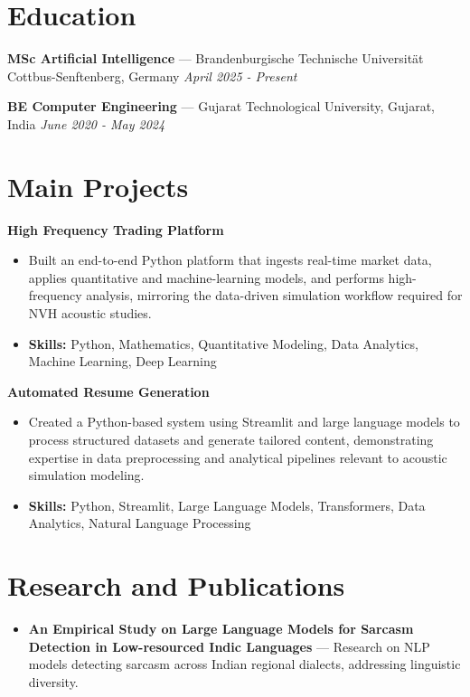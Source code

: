 \documentclass[a4paper,10pt]{article}
\begin{document}
\section*{Education}
\textbf{MSc Artificial Intelligence} — Brandenburgische Technische Universität Cottbus-Senftenberg, Germany \hfill \textit{April 2025 - Present}\par
\vspace{1.5pt}
\textbf{BE Computer Engineering} — Gujarat Technological University, Gujarat, India \hfill \textit{June 2020 - May 2024}\par

\section*{Main Projects}
\textbf{High Frequency Trading Platform}\par
\vspace{1pt}
\begin{itemize}
  \item Built an end-to-end Python platform that ingests real-time market data, applies quantitative and machine-learning models, and performs high-frequency analysis, mirroring the data-driven simulation workflow required for NVH acoustic studies.
  \item \textbf{Skills:} Python, Mathematics, Quantitative Modeling, Data Analytics, Machine Learning, Deep Learning
\end{itemize}
\vspace{3pt}
\textbf{Automated Resume Generation}\par
\vspace{1pt}
\begin{itemize}
  \item Created a Python-based system using Streamlit and large language models to process structured datasets and generate tailored content, demonstrating expertise in data preprocessing and analytical pipelines relevant to acoustic simulation modeling.
  \item \textbf{Skills:} Python, Streamlit, Large Language Models, Transformers, Data Analytics, Natural Language Processing
\end{itemize}

\section*{Research and Publications}
\begin{itemize}
\item \textbf{An Empirical Study on Large Language Models for Sarcasm Detection in Low-resourced Indic Languages} — Research on NLP models detecting sarcasm across Indian regional dialects, addressing linguistic diversity.
\end{itemize}
\end{document}
